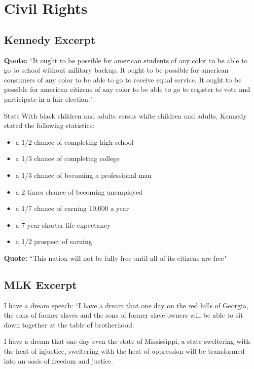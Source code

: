 \documentclass[12pt, a4paper, twoside, openright, titlepage]{book}
\begin{document}
\section{Civil Rights}

\subsection{Kennedy Excerpt}

\textbf{Quote:} ``It ought to be possible for american students of any color to be able to go to school without military backup. It ought to be possible for american consumers of any color to be able to go to receive equal service. It ought to be possible for american citizens of any color to be able to go to register to vote and participate in a fair election."

\begin{rmk}{Stats}{}
    With black children and adults versus white children and adults, Kennedy stated the following statistics: \begin{itemize}
        \item a 1/2 chance of completing high school
        \item a 1/3 chance of completing college
        \item a 1/3 chance of becoming a professional man
        \item a 2 times chance of becoming unemployed
        \item a 1/7 chance of earning 10,000 a year
        \item a 7 year shorter life expectancy
        \item a 1/2 prospect of earning
    \end{itemize}
\end{rmk}

\textbf{Quote:} ``This nation will not be fully free until all of its citizens are free"


\subsection{MLK Excerpt}

I have a dream speech: ``I have a dream that one day on the red hills of Georgia, the sons of former slaves and the sons of former slave owners will be able to sit down together at the table of brotherhood.

I have a dream that one day even the state of Mississippi, a state sweltering with the heat of injustice, sweltering with the heat of oppression will be transformed into an oasis of freedom and justice.
\end{document}
